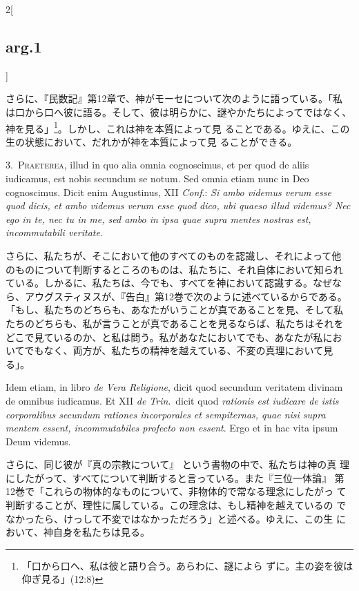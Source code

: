 \documentclass[paper=a4paper,fontsize=10pt,jafontsize=9pt,titlepage]{jlreq}
\begin{document}
\begin{paracol}{2}[\subsection{arg.1}]
\switchcolumn

さらに、『民数記』第12章で、神がモーセについて次のように語っている。「私
は口から口へ彼に語る。そして、彼は明らかに、謎やかたちによってではなく、
神を見る」\footnote{「口から口へ、私は彼と語り合う。あらわに、謎によら
ずに。主の姿を彼は仰ぎ見る」(12:8)}。しかし、これは神を本質によって見
ることである。ゆえに、この生の状態において、だれかが神を本質によって見
ることができる。


3.~{\scshape Praeterea}, illud in quo alia omnia cognoscimus, et per quod
de aliis iudicamus, est nobis secundum se notum. Sed omnia etiam nunc
in Deo cognoscimus. Dicit enim Augustinus, XII {\itshape Conf}.: {\itshape Si
ambo videmus verum esse quod dicis, et ambo videmus verum esse quod
dico, ubi quaeso illud videmus? Nec ego in te, nec tu in me, sed ambo
in ipsa quae supra mentes nostras est, incommutabili
veritate}.

\switchcolumn

さらに、私たちが、そこにおいて他のすべてのものを認識し、それによって他
のものについて判断するところのものは、私たちに、それ自体において知られ
ている。しかるに、私たちは、今でも、すべてを神において認識する。なぜな
ら、アウグスティヌスが、『告白』第12巻で次のように述べているからである。
「もし、私たちのどちらも、あなたがいうことが真であることを見、そして私
たちのどちらも、私が言うことが真であることを見るならば、私たちはそれを
どこで見ているのか、と私は問う。私があなたにおいてでも、あなたが私にお
いてでもなく、両方が、私たちの精神を越えている、不変の真理において見
る」。

\switchcolumn*

Idem etiam, in libro {\itshape de Vera Religione}, dicit quod secundum
veritatem divinam de omnibus iudicamus. Et XII {\itshape de Trin}.~dicit
quod {\itshape rationis est iudicare de istis corporalibus secundum
rationes incorporales et sempiternas, quae nisi supra mentem essent,
incommutabiles profecto non essent}. Ergo et in hac vita ipsum Deum
videmus.

\switchcolumn

さらに、同じ彼が『真の宗教について』 という書物の中で、私たちは神の真
理にしたがって、すべてについて判断すると言っている。また『三位一体論』
第12巻で「これらの物体的なものについて、非物体的で常なる理念にしたがっ
て判断することが、理性に属している。この理念は、もし精神を越えているの
でなかったら、けっして不変ではなかっただろう」と述べる。ゆえに、この生
において、神自身を私たちは見る。


\end{paracol}
\end{document}
